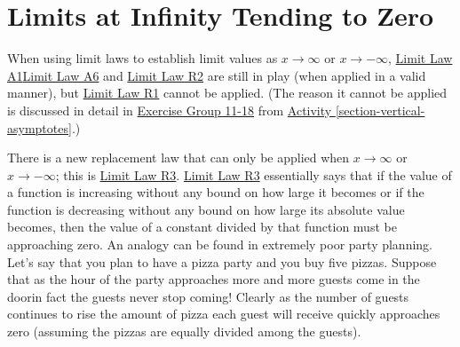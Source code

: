 \documentclass[12pt,]{book}
\theoremstyle{plain}
\theoremstyle{definition}
\numberwithin{equation}{section}
\begin{document}
\section[Limits at Infinity Tending to Zero]{Limits at Infinity Tending to Zero}\label{section-limits-at-infinity-tending-to-zero}
When using limit laws to establish limit values as \(x\to\infty\) or \(x\to-\infty\), \hyperref[lla1]{Limit Law A1}\textendash{}\hyperref[lla6]{Limit Law A6} and  \hyperref[llr2]{Limit Law R2} are still in play (when applied in a valid manner), but \hyperref[llr1]{Limit Law R1} cannot be applied. (The reason it cannot be applied is discussed in detail in \hyperlink{exercisegroup-hear-me}{Exercise Group 11-18} from \hyperref[section-vertical-asymptotes]{Activity \ref{section-vertical-asymptotes}}.)%
\par
There is a new replacement law that can only be applied when \(x\to\infty\) or \(x\to-\infty\); this is \hyperref[llr3]{Limit Law R3}. \hyperref[llr3]{Limit Law R3} essentially says that if the value of a function is increasing without any bound on how large it becomes or if the function is decreasing without any bound on how large its absolute value becomes, then the value of a constant divided by that function must be approaching zero. An analogy can be found in extremely poor party planning. Let's say that you plan to have a pizza party and you buy five pizzas. Suppose that as the hour of the party approaches more and more guests come in the door\textemdash{}in fact the guests never stop coming! Clearly as the number of guests continues to rise the amount of pizza each guest will receive quickly approaches zero (assuming the pizzas are equally divided among the guests).%
\typeout{************************************************}
\typeout{************************************************}
\end{document}
